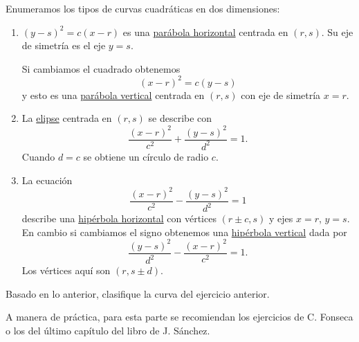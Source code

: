 \documentclass[12pt]{article}
\theoremstyle{plain}
\theoremstyle{definition}
\theoremstyle{remark}
\renewcommand{\:}{\colon}           %
\newcommand{\un}[1]{\underline{#1}}
\renewcommand{\.}{\Cdot}                %
\begin{document}
\begin{multicols}{2}
Enumeramos los tipos de curvas cuadráticas en dos dimensiones:
\vspace{-1em}
\begin{enumerate}
  \itemsep=-0.5em
  \item $(y-s)^2=c(x-r)$ es una \un{parábola horizontal} centrada en $(r,s)$. Su eje de simetría es el eje $y=s$.\par 
  Si cambiamos el cuadrado obtenemos
  $$(x-r)^2=c(y-s)$$
  y esto es una \un{parábola vertical} centrada en $(r,s)$ con eje de simetría $x=r$.
  \item La \un{elipse} centrada en $(r,s)$ se describe con 
  $$\frac{(x-r)^2}{c^2}+\frac{(y-s)^2}{d^2}=1.$$
  Cuando $d=c$ se obtiene un círculo de radio $c$.
  \item La ecuación 
  $$\frac{(x-r)^2}{c^2}-\frac{(y-s)^2}{d^2}=1$$
  describe una \un{hipérbola horizontal} con vértices $(r\pm c,s)$ y ejes $x=r$, $y=s$. En cambio si cambiamos el signo obtenemos una \un{hipérbola vertical} dada por 
  $$\frac{(y-s)^2}{d^2}-\frac{(x-r)^2}{c^2}=1.$$
  Los vértices aquí son $(r,s\pm d)$.
\end{enumerate}
\begin{ptcbP}
  Basado en lo anterior, clasifique la curva del ejercicio anterior.
\end{ptcbP}

A manera de práctica, para esta parte se recomiendan los ejercicios de C. Fonseca o los del último capítulo del libro de J. Sánchez.
\end{multicols}
\end{document}
